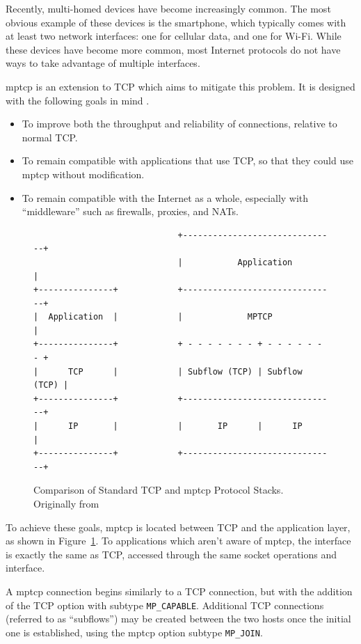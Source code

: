 \documentclass{cwru}
\begin{document}
Recently, multi-homed devices have become increasingly common. The most obvious
example of these devices is the smartphone, which typically comes with at least
two network interfaces: one for cellular data, and one for Wi-Fi. While these
devices have become more common, most Internet protocols do not have ways to
take advantage of multiple interfaces.

\ac{mptcp} is an extension to TCP which aims to mitigate this problem. It is
designed with the following goals in mind \cite{rfc6824}.

\begin{itemize}
  \item To improve both the throughput and reliability of connections, relative
    to normal TCP.
  \item To remain compatible with applications that use TCP, so that they could
    use \ac{mptcp} without modification.
  \item To remain compatible with the Internet as a whole, especially with
    ``middleware'' such as firewalls, proxies, and NATs.
\end{itemize}

\begin{figure}[h]
  \centering
\begin{BVerbatim}
                             +-------------------------------+
                             |           Application         |
+---------------+            +-------------------------------+
|  Application  |            |             MPTCP             |
+---------------+            + - - - - - - - + - - - - - - - +
|      TCP      |            | Subflow (TCP) | Subflow (TCP) |
+---------------+            +-------------------------------+
|      IP       |            |       IP      |      IP       |
+---------------+            +-------------------------------+
\end{BVerbatim}
\caption[Comparison of TCP and \acs{mptcp} Protocol Stacks]{Comparison of
  Standard TCP and \ac{mptcp} Protocol Stacks. Originally from \cite{rfc6824}}
  \label{fig:layers}
\end{figure}

To achieve these goals, \ac{mptcp} is located between TCP and the application
layer, as shown in Figure~\ref{fig:layers}. To applications which aren't aware
of \ac{mptcp}, the interface is exactly the same as TCP, accessed through the
same socket operations and interface.

A \ac{mptcp} connection begins similarly to a TCP connection, but with the
addition of the TCP option with subtype \texttt{MP\_CAPABLE}. Additional TCP
connections (referred to as ``subflows'') may be created between the two hosts
once the initial one is established, using the \ac{mptcp} option subtype
\texttt{MP\_JOIN}.
\end{document}
